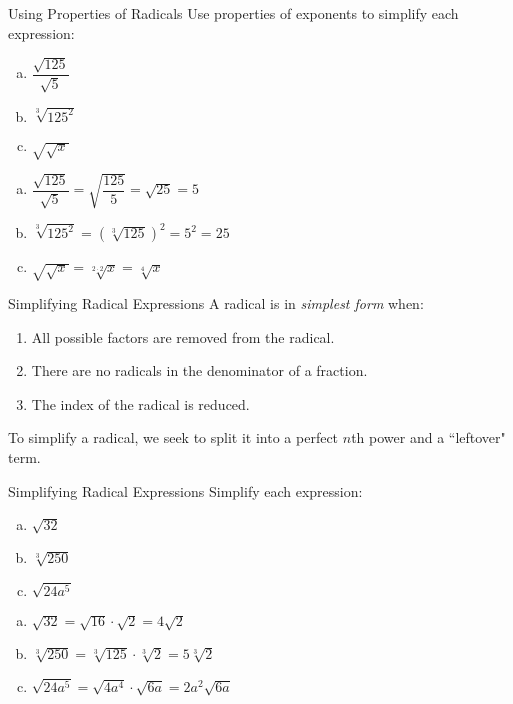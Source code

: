 \documentclass{beamer}
\newcommand{\fp}[1]{\left({#1}\right)} %
\begin{document}
\begin{frame}[t]{Using Properties of Radicals}
Use properties of exponents to simplify each expression:
\begin{enumerate}[(a)]
\item $\dfrac{\sqrt{125}}{\sqrt{5}}$
\item $\sqrt[3]{125^2}$
\item $\sqrt{\sqrt{x}}$
\end{enumerate}

\pause
\begin{enumerate}[(a)]
\item $\dfrac{\sqrt{125}}{\sqrt{5}} = \sqrt{\dfrac{125}{5}} = \sqrt{25} = 5$ \pause
\item $\sqrt[3]{125^2} = \fp{\sqrt[3]{125}}^2 = 5^2 = 25$ \pause
\item $\sqrt{\sqrt{x}} = \sqrt[2\cdot 2]{x} = \sqrt[4]{x}$
\end{enumerate}

\end{frame}

\begin{frame}[t]{Simplifying Radical Expressions}
A radical is in \textit{simplest form} when: \begin{enumerate}
\item All possible factors are removed from the radical.
\item There are no radicals in the denominator of a fraction.
\item The index of the radical is reduced.
\end{enumerate}

To simplify a radical, we seek to split it into a perfect $n$th power and a ``leftover" term.
\end{frame}

\begin{frame}[t]{Simplifying Radical Expressions}
Simplify each expression: \begin{enumerate}[(a)]
\item $\sqrt{32}$
\item $\sqrt[3]{250}$
\item $\sqrt{24a^5}$
\end{enumerate}

\pause
\begin{enumerate}[(a)]
\item $\sqrt{32} = \sqrt{16}\cdot\sqrt{2} = 4\sqrt{2}$ \pause
\item $\sqrt[3]{250} = \sqrt[3]{125}\cdot \sqrt[3]{2} = 5\sqrt[3]{2}$ \pause
\item $\sqrt{24a^5} = \sqrt{4a^4}\cdot \sqrt{6a}=2a^2\sqrt{6a}$
\end{enumerate}

\end{frame}
\end{document}
